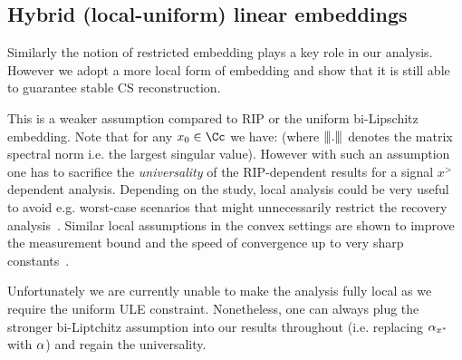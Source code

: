 \subsection{Hybrid (local-uniform) linear embeddings}
Similarly the notion of restricted embedding plays a key role in our analysis. However we adopt a more local form of embedding and show that it is still able to guarantee stable CS reconstruction. 
{}
	\newline

This is a weaker assumption compared to RIP or the uniform bi-Lipschitz embedding. Note that for any $x_0\in \Cc$ we have:  
(where ${\left\vert\kern-0.25ex\left\vert\kern-0.25ex\left\vert . \right\vert\kern-0.25ex\right\vert\kern-0.25ex\right\vert}$ denotes the matrix spectral norm i.e. the largest singular value). 
However with such an assumption one has to sacrifice the \emph{universality} of the RIP-dependent results for a signal $x^\gt$ dependent analysis. Depending on the study, local analysis could be very useful to avoid e.g. worst-case scenarios that might unnecessarily restrict the recovery analysis~\cite{me:modelselecion}. Similar local assumptions in the convex settings are shown   to improve the measurement bound and the speed of convergence up to very sharp constants~\cite{recht:GW, Oymak:tradeoff}. 

Unfortunately we are currently unable to make the analysis fully local as we require the uniform ULE constraint. Nonetheless, one can always plug the stronger bi-Liptchitz assumption into our results throughout (i.e. replacing $\alpha_{x^*}$ with $\alpha$) and regain the universality.  


